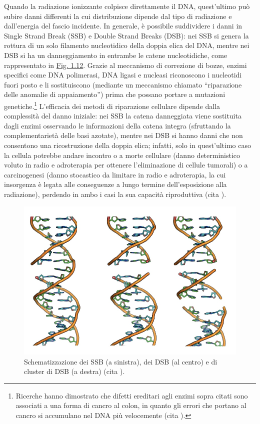 \documentclass[12pt,a4paper,twoside]{report}
\begin{document}
	Quando la radiazione ionizzante colpisce direttamente il DNA, quest'ultimo può subire danni differenti la cui distribuzione dipende dal tipo di radiazione e dall'energia del fascio incidente. In generale, è possibile suddividere i danni in Single Strand Break (SSB) e Double Strand Breaks (DSB): nei SSB si genera la rottura di un solo filamento nucleotidico della doppia elica del DNA, mentre nei DSB si ha un danneggiamento in entrambe le catene nucleotidiche, come rappresentato in \hyperref[fig:danni_dna]{Fig. 1.12}. Grazie al meccanismo di correzione di bozze, enzimi specifici come DNA polimerasi, DNA ligasi e nucleasi riconoscono i nucleotidi fuori posto e li sostituiscono (mediante un meccanismo chiamato ``riparazione delle anomalie di appaiamento'') prima che possano portare a mutazioni genetiche.\footnote{Ricerche hanno dimostrato che difetti ereditari agli enzimi sopra citati sono associati a una forma di cancro al colon, in quanto gli errori che portano al cancro si accumulano nel DNA più velocemente (cita
	).} L'efficacia dei metodi di riparazione cellulare dipende dalla complessità del danno iniziale: nei SSB la catena danneggiata viene sostituita dagli enzimi osservando le informazioni della catena integra (sfruttando la complementarietà delle basi azotate), mentre nei DSB si hanno danni che non consentono una ricostruzione della doppia elica; infatti, solo in quest'ultimo caso la cellula potrebbe andare incontro o a morte cellulare (danno deterministico voluto in radio e adroterapia per ottenere l'eliminazione di cellule tumorali) o a carcinogenesi (danno stocastico da limitare in radio e adroterapia, la cui insorgenza è legata alle conseguenze a lungo termine dell'esposizione alla radiazione), perdendo in ambo i casi la sua capacità riproduttiva (cita
	).
	\begin{figure}[H]
		\centering
		\includegraphics[width=0.9\linewidth]{danni_dna.jpg}
		\caption{Schematizzazione dei SSB (a sinistra), dei DSB (al centro) e di cluster di DSB (a destra) (cita
			).}
		\label{fig:danni_dna}
	\end{figure}
	
\end{document}
